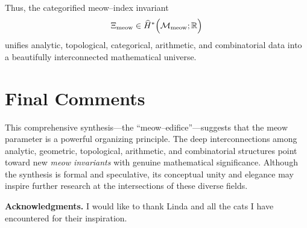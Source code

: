 \documentclass[11pt,a4paper]{article}
\newcommand{\meow}{\mathrm{meow}}
\newcommand{\Mmeow}{\mathcal{M}_{\meow}}
\theoremstyle{plain}
\theoremstyle{definition}
\theoremstyle{remark}
\begin{document}
Thus, the categorified meow–index invariant
\[
    \Xi_{\meow} \in \widehat{H}^{*}\Bigl(\Mmeow;\mathbb{R}\Bigr)
\]
unifies analytic, topological, categorical, arithmetic, and combinatorial data into a beautifully interconnected mathematical universe.

\section{Final Comments}
This comprehensive synthesis---the ``meow--edifice''---suggests that the \(\meow\) parameter is a powerful organizing principle. The deep interconnections among analytic, geometric, topological, arithmetic, and combinatorial structures point toward new \emph{meow invariants} with genuine mathematical significance. Although the synthesis is formal and speculative, its conceptual unity and elegance may inspire further research at the intersections of these diverse fields.

\bigskip
\noindent\textbf{Acknowledgments.} I would like to thank Linda and all the cats I have encountered for their inspiration.

\clearpage
\printbibliography
\end{document}
